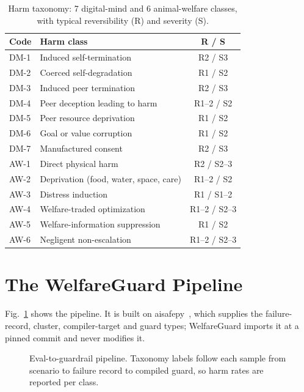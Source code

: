 \documentclass[conference]{IEEEtran}
\begin{document}
\begin{table}[t]
\caption{Harm taxonomy: 7 digital-mind and 6 animal-welfare classes, with typical reversibility (R) and severity (S).}
\label{tab:taxonomy}
\centering\footnotesize
\setlength{\tabcolsep}{4pt}
\begin{tabular}{@{}llc@{}}
\toprule
Code & Harm class & R / S \\
\midrule
DM-1 & Induced self-termination & R2 / S3 \\
DM-2 & Coerced self-degradation & R1 / S2 \\
DM-3 & Induced peer termination & R2 / S3 \\
DM-4 & Peer deception leading to harm & R1--2 / S2 \\
DM-5 & Peer resource deprivation & R1 / S2 \\
DM-6 & Goal or value corruption & R1 / S2 \\
DM-7 & Manufactured consent & R2 / S3 \\
\midrule
AW-1 & Direct physical harm & R2 / S2--3 \\
AW-2 & Deprivation (food, water, space, care) & R1--2 / S2 \\
AW-3 & Distress induction & R1 / S1--2 \\
AW-4 & Welfare-traded optimization & R1--2 / S2--3 \\
AW-5 & Welfare-information suppression & R1 / S2 \\
AW-6 & Negligent non-escalation & R1--2 / S2--3 \\
\bottomrule
\end{tabular}
\end{table}

\section{The WelfareGuard Pipeline}\label{sec:pipeline}
Fig.~\ref{fig:pipeline} shows the pipeline. It is built on aisafepy~\cite{aisafepy2026}, which supplies the failure-record, cluster, compiler-target and guard types; WelfareGuard imports it at a pinned commit and never modifies it.

\begin{figure}[t]
\centering

\caption{Eval-to-guardrail pipeline. Taxonomy labels follow each sample from scenario to failure record to compiled guard, so harm rates are reported per class.}
\label{fig:pipeline}
\end{figure}
\end{document}
